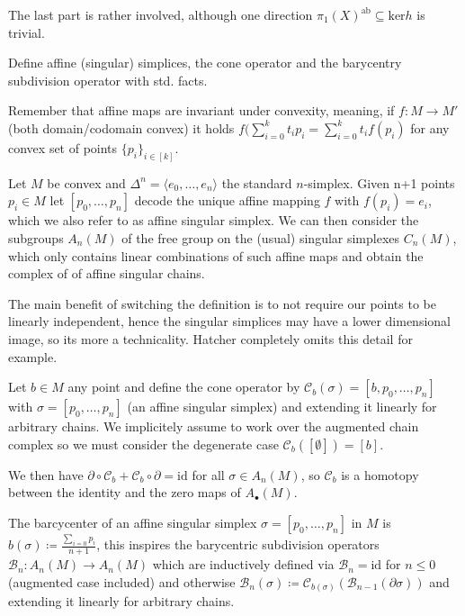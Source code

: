 The last part is rather involved, although one direction \( \pi_1(X)^{\text{ab}} \subseteq \text{ker} h\) is trivial.


Define affine (singular) simplices, the cone operator and the barycentry subdivision operator
with std. facts.

Remember that affine maps are invariant under convexity, meaning, if \(f : M \to M'\) (both domain/codomain convex)
it holds \( f(\sum_{i=0}^k t_i p_i  = \sum_{i=0}^k t_if(p_i) \) for any convex set of points \( \{p_i\}_{i \in [k]} \).

Let \( M \) be convex and \( \Delta^n = \langle e_0, \dots, e_n \rangle\) the standard \( n \)-simplex.
Given n+1 points \(p_i \in M\) let \( [p_0, \dots, p_n] \) decode the unique affine mapping \( f \) with \( f(p_i) = e_i \),
which we also refer to as affine singular simplex.
We can then consider the subgroups \( A_n(M) \) of the free group on the (usual) singular simplexes \( C_n(M) \), which only contains
linear combinations of such affine maps and obtain the complex of of affine singular chains.

The main benefit of switching the definition is to not require our points to be linearly independent, hence the singular simplices may have a lower dimensional image,
so its more a technicality. Hatcher completely omits this detail for example.

Let \( b \in M \) any point
and define the cone operator by \( \mathcal{C}_b(\sigma) = [b, p_0, \dots, p_n] \) with \( \sigma = [p_0, \dots, p_n] \) (an affine singular simplex)
and extending it linearly for arbitrary chains.
We implicitely assume to work over the augmented chain complex so we must consider the degenerate case \( \mathcal{C}_b([\emptyset]) = [b] \).

We then have 
\( \partial \circ \mathcal{C}_b + \mathcal{C}_b \circ \partial = \text{id} \)
for all \( \sigma \in A_n(M) \), so \( \mathcal{C}_b \) is a homotopy between the identity and the zero maps of \( A_\bullet(M) \).


The barcycenter of an affine singular simplex \( \sigma = [p_0, \dots, p_n] \) in \( M \) is \( b(\sigma) \coloneqq \frac{\sum_{i=0} p_i}{n+1} \),
this inspires the barycentric subdivision operators \( \mathcal{B}_n : A_n(M) \to A_n(M) \) which are inductively defined via \( \mathcal{B}_n = \text{id} \)
for \( n \leq 0 \) (augmented case included) and otherwise \( \mathcal{B}_n(\sigma) \coloneqq \mathcal{C}_{b(\sigma)}(\mathcal{B}_{n-1}(\partial \sigma)) \)
and extending it linearly for arbitrary chains.

